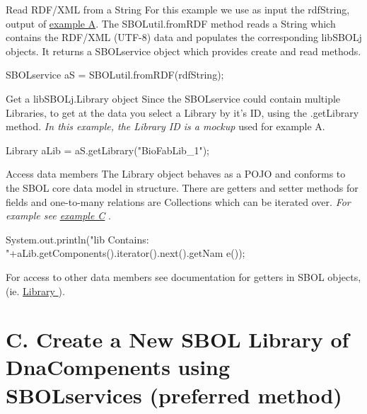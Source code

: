 \begin{DoxyEnumerate}
\item \begin{DoxyParagraph}{Read RDF/XML from a String}
For this example we use as input the rdfString, output of \hyperlink{tutorial_A}{example A}. The SBOLutil.fromRDF method reads a String which contains the RDF/XML (UTF-\/8) data and populates the corresponding libSBOLj objects. It returns a SBOLservice object which provides create and read methods. 
\begin{DoxyCode}
SBOLservice aS = SBOLutil.fromRDF(rdfString);
\end{DoxyCode}

\end{DoxyParagraph}

\item \begin{DoxyParagraph}{Get a libSBOLj.Library object}
Since the SBOLservice could contain multiple Libraries, to get at the data you select a Library by it's ID, using the .getLibrary method. {\itshape In this example, the Library ID is a mockup\/} used for example A. 
\begin{DoxyCode}
Library aLib = aS.getLibrary("BioFabLib_1");
\end{DoxyCode}

\end{DoxyParagraph}

\item \begin{DoxyParagraph}{Access data members}
The Library object behaves as a POJO and conforms to the SBOL core data model in structure. There are getters and setter methods for fields and one-\/to-\/many relations are Collections which can be iterated over. {\itshape For example see \hyperlink{tutorial_C}{example C} \/}. 
\begin{DoxyCode}
System.out.println("lib Contains: "+aLib.getComponents().iterator().next().getNam
      e());
\end{DoxyCode}

\end{DoxyParagraph}
For access to other data members see documentation for getters in SBOL objects, (ie. \hyperlink{classorg_1_1sbolstandard_1_1lib_s_b_o_lj_1_1_library}{Library }).
\end{DoxyEnumerate}



 \hypertarget{tutorial_C}{}\section{C. Create a New SBOL Library of DnaCompenents using SBOLservices (preferred method)}\label{tutorial_C}

